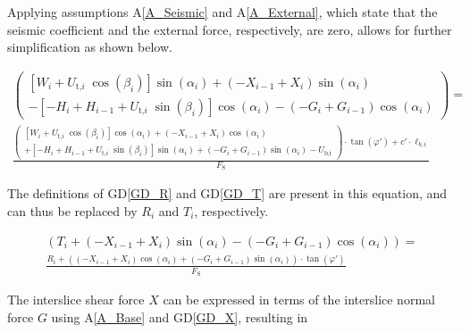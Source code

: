 \documentclass[12pt]{article}
\newcommand{\aref}[1]{A\ref{#1}}
\newcommand{\dref}[1]{GD\ref{#1}}
\begin{document}
\noindent Applying assumptions \aref{A_Seismic} and \aref{A_External}, which 
state that the seismic coefficient and the external force, respectively, are 
zero, allows for further simplification as shown below.

\begin{equation*}
\begin{array}{l} \left( \begin{array}{l} \left[
W_{i} +
{U_{\text{t,}i}}\;{\cos\left(\beta_{i}\right)}
\right]\sin\left(\alpha_{i}\right) + \left(-X_{i-1} + 
X_{i}\right)\sin\left(\alpha_{i}\right)\\ - \left[
{- H_{i} + H_{i-1} +
{U_{\text{t,}i}}\;{\sin\left(\beta_{i}\right)}}
\right]\cos\left(\alpha_{i}\right)
 - \left(- G_{i} + 
G_{i-1}\right)\cos\left(\alpha_{i}\right) \end{array} 
\right) =\\ \frac 
{ 
	\left( \begin{array}{l}
	\left[ W_{i} +
	{U_{\text{t,}i}}\;{\cos\left(\beta_{i}\right)}
	\right]\cos\left(\alpha_{i}\right) + \left(- X_{i-1} 
	+ X_{i}\right)\cos\left(\alpha_{i}\right) \\ + \left[
	{- H_{i} + H_{i-1} +
	{U_{\text{t,}i}}\;{\sin\left(\beta_{i}\right)}}
	\right]\sin\left(\alpha_{i}\right) + \left(- G_{i} + 
	G_{i-1}\right)\sin\left(\alpha_{i}\right) -
	U_{\text{b,i}} \end{array} \right) \cdot \tan\left( 
	\varphi'
	\right) + c' \cdot \ell_{b,i} }{F_\text{S}} \end{array}
\end{equation*}

\noindent The definitions of \dref{GD_R} and \dref{GD_T} are present in this 
equation, and can thus be replaced by $R_i$ and $T_i$, respectively.

\begin{equation*}
\begin{array}{l} \left( T_{i} + \left(-X_{i-1} + 
X_{i}\right)\sin\left(\alpha_{i}\right)
- \left(- G_{i} + 
G_{i-1}\right)\cos\left(\alpha_{i}\right)
\right) =\\ \frac 
{ 
	R_{i} + \left(\left(- X_{i-1} 
	+ X_{i}\right)\cos\left(\alpha_{i}\right) + \left(- 
	G_{i} + 
	G_{i-1}\right)\sin\left(\alpha_{i}\right) \right) \cdot 
	\tan\left( 
	\varphi'
	\right)}{F_\text{S}} \end{array}
\end{equation*}

\noindent The interslice shear force $X$ can be expressed in terms of the 
interslice normal force $G$ using \aref{A_Base} and \dref{GD_X}, resulting in
\end{document}
